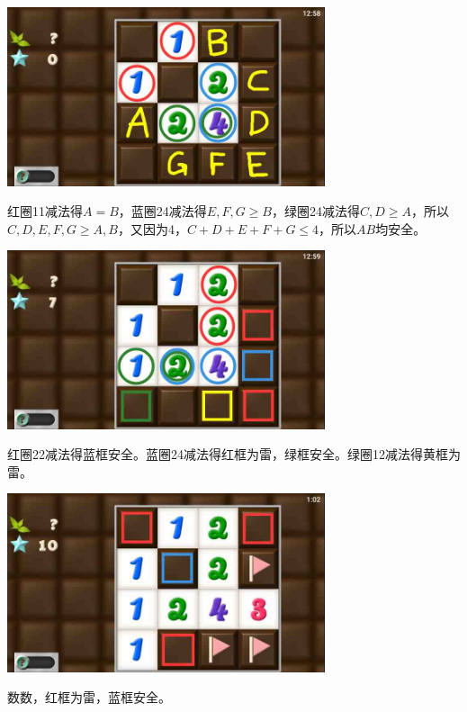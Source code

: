 \subsection{} %
\begin{center}
    \includegraphics[width=0.7\textwidth]{puzzlelow/139-1.jpg}
\end{center}
红圈11减法得$A=B$，蓝圈24减法得$E,F,G\ge B$，绿圈24减法得$C,D\ge A$，所以$C,D,E,F,G\ge A,B$，又因为4，$C+D+E+F+G\le 4$，所以$AB$均安全。
\begin{center}
    \includegraphics[width=0.7\textwidth]{puzzlelow/139-2.jpg}
\end{center}
红圈22减法得蓝框安全。蓝圈24减法得红框为雷，绿框安全。绿圈12减法得黄框为雷。
\begin{center}
    \includegraphics[width=0.7\textwidth]{puzzlelow/139-3.jpg}
\end{center}
数数，红框为雷，蓝框安全。

